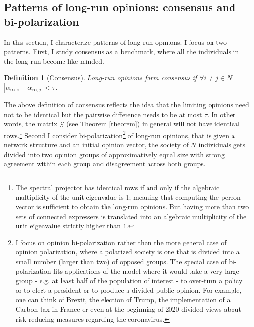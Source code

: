 \documentclass{article}
\newtheorem{definition}{Definition}
\begin{document}
\subsection{Patterns of long-run opinions: consensus and bi-polarization} \label{patterns}

In this section, I characterize patterns of long-run opinions. I focus on two patterns. First, I study consensus as a benchmark, where all the individuals in the long-run become like-minded.
\begin{definition}[Consensus] Long-run opinions form consensus if $\forall i \neq j \in N$, $|\alpha_{\infty,i} - \alpha_{\infty,j}| < \tau $. 
\end{definition}

The above definition of consensus reflects the idea that the limiting opinions need not to be identical but the pairwise difference needs to be at most $\tau$. In other words, the matrix $\mathcal{G}$ (see Theorem \ref{theorem}) in general will not have identical rows.\footnote{The spectral projector has identical rows if and only if the algebraic multiplicity of the unit eigenvalue is $1$; meaning that computing the perron vector is sufficient to obtain the long-run opinions. But having more than two sets of connected expressers is translated into an algebraic multiplicity of the unit eigenvalue strictly higher than $1$.}
Second I consider bi-polarization\footnote{I focus on opinion bi-polarization rather than the more general case of opinion polarization, where a polarized society is one that is divided into a small number (larger than two) of opposed groups. The special case of bi-polarization fits applications of the model where it would take a very large group - e.g. at least half of the population of interest - to over-turn a policy or to elect a president or to produce a divided public opinion. For example, one can think of Brexit, the election of Trump, the implementation of a Carbon tax in France or even at the beginning of 2020 divided views about risk reducing measures regarding the coronavirus.} of long-run opinions, that is given a network structure and an initial opinion vector, the society of $N$ individuals gets divided into two opinion groups of approximatively equal size with strong agreement within each group and disagreement across both groups. 
\end{document}
